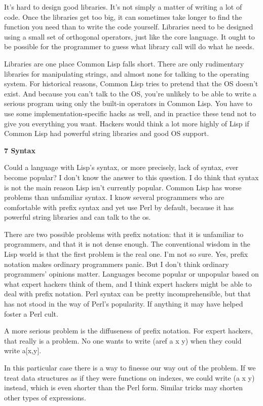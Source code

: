 It's hard to design good libraries. It's not simply a matter of writing
a lot of code. Once the libraries get too big, it can sometimes take
longer to find the function you need than to write the code yourself.
Libraries need to be designed using a small set of orthogonal operators,
just like the core language. It ought to be possible for the programmer
to guess what library call will do what he needs.

Libraries are one place Common Lisp falls short. There are only
rudimentary libraries for manipulating strings, and almost none for
talking to the operating system. For historical reasons, Common Lisp
tries to pretend that the OS doesn't exist. And because you can't talk
to the OS, you're unlikely to be able to write a serious program using
only the built-in operators in Common Lisp. You have to use some
implementation-specific hacks as well, and in practice these tend not to
give you everything you want. Hackers would think a lot more highly of
Lisp if Common Lisp had powerful string libraries and good OS support.

\textbf{7 Syntax}

Could a language with Lisp's syntax, or more precisely, lack of syntax,
ever become popular? I don't know the answer to this question. I do
think that syntax is not the main reason Lisp isn't currently popular.
Common Lisp has worse problems than unfamiliar syntax. I know several
programmers who are comfortable with prefix syntax and yet use Perl by
default, because it has powerful string libraries and can talk to the
os.

There are two possible problems with prefix notation: that it is
unfamiliar to programmers, and that it is not dense enough. The
conventional wisdom in the Lisp world is that the first problem is the
real one. I'm not so sure. Yes, prefix notation makes ordinary
programmers panic. But I don't think ordinary programmers' opinions
matter. Languages become popular or unpopular based on what expert
hackers think of them, and I think expert hackers might be able to deal
with prefix notation. Perl syntax can be pretty incomprehensible, but
that has not stood in the way of Perl's popularity. If anything it may
have helped foster a Perl cult.

A more serious problem is the diffuseness of prefix notation. For expert
hackers, that really is a problem. No one wants to write (aref a x y)
when they could write a{[}x,y{]}.

In this particular case there is a way to finesse our way out of the
problem. If we treat data structures as if they were functions on
indexes, we could write (a x y) instead, which is even shorter than the
Perl form. Similar tricks may shorten other types of expressions.

